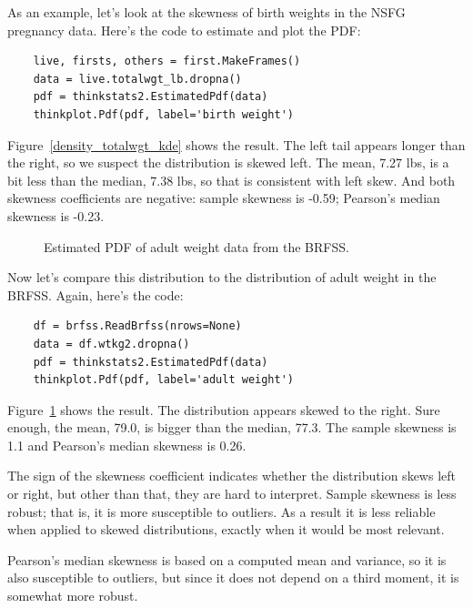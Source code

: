 As an example, let's look at the skewness of birth weights in the
NSFG pregnancy data.  Here's the code to estimate and plot the PDF:

\begin{verbatim}
    live, firsts, others = first.MakeFrames()
    data = live.totalwgt_lb.dropna()
    pdf = thinkstats2.EstimatedPdf(data)
    thinkplot.Pdf(pdf, label='birth weight')
\end{verbatim}

Figure~\ref{density_totalwgt_kde} shows the result.  The left tail appears
longer than the right, so we suspect the distribution is skewed left.
The mean, 7.27 lbs, is a bit less than
the median, 7.38 lbs, so that is consistent with left skew.
And both skewness coefficients are negative:
sample skewness is -0.59;
Pearson's median skewness is -0.23.

\begin{figure}
\caption{Estimated PDF of adult weight data from the BRFSS.}
\label{density_wtkg2_kde}
\end{figure}

Now let's compare this distribution to the distribution of adult
weight in the BRFSS.  Again, here's the code:

\begin{verbatim}
    df = brfss.ReadBrfss(nrows=None)
    data = df.wtkg2.dropna()
    pdf = thinkstats2.EstimatedPdf(data)
    thinkplot.Pdf(pdf, label='adult weight')
\end{verbatim}

Figure~\ref{density_wtkg2_kde} shows the result.  The distribution
appears skewed to the right.  Sure enough, the mean, 79.0, is bigger
than the median, 77.3.  The sample skewness is 1.1 and Pearson's
median skewness is 0.26.

The sign of the skewness coefficient indicates whether the distribution
skews left or right, but other than that, they are hard to interpret.
Sample skewness is less robust; that is, it is more
susceptible to outliers.  As a result it is less reliable
when applied to skewed distributions, exactly when it would be most
relevant.

Pearson's median skewness is based on a computed mean and variance,
so it is also susceptible to outliers, but since it does not depend
on a third moment, it is somewhat more robust.


